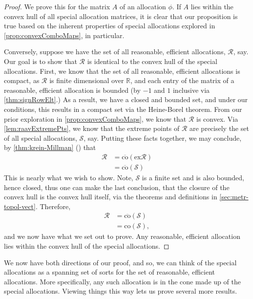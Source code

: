 \documentclass[12pt,letterpaper,final]{article}
\theoremstyle{plain}
\theoremstyle{plain}
\theoremstyle{plain}
\theoremstyle{plain}
\theoremstyle{plain}
\theoremstyle{plain}
\theoremstyle{plain}
\theoremstyle{definition}
\theoremstyle{definition}
\theoremstyle{definition}
\theoremstyle{definition}
\theoremstyle{definition}
\theoremstyle{remark}
\theoremstyle{remark}
\theoremstyle{remark}
\theoremstyle{remark}
\begin{document}
\begin{proof}
  We prove this for the matrix \(A\) of an allocation
  \(\phi\).  If \(A\) lies within the convex hull of all special
  allocation matrices, it is
  clear that our proposition is true based on the inherent properties
  of special allocations explored in \cref{prop:convexComboMaps}, in
  particular.

  Conversely, suppose we have the set of all reasonable, efficient allocations,
  \(\mathcal{R}\), say. Our goal is to show that
  \(\mathcal{R}\) is identical to the convex hull of the special allocations.
  First, we know that the set of all reasonable, efficient allocations is compact, as
  \(\mathcal{R}\) is finite dimensional over \(\mathbb{R}\), and each
  entry of the matrix of a reasonable, efficient allocation is bounded (by \(-1\) and
  \(1\) inclusive via \cref{thm:signRowElt}.) 
  As a result, we have a closed and bounded set, and
  under our conditions, this results in a compact set via the
  Heine-Borel theorem.
  From our prior exploration in
  \cref{prop:convexComboMaps}, we know that \(\mathcal{R}\)
  is convex. Via \cref{lem:raavExtremePts}, we know that the
  extreme points of \(\mathcal{R}\) are precisely the set of all
  special allocations, \(\mathcal{S}\), say. Putting these facts together, we
  may conclude, by  \cref{thm:krein-Millman}
  () that 
  \begin{align*}
    \mathcal{R}&=\overline{\text{co}}\left(\text{ex}\mathcal{R}\right)\\
               &=\overline{\text{co}}\left(\mathcal{S}\right)
  \end{align*}
  This is nearly what we wish to show. Note, 
  \(\mathcal{S}\) is a finite set and is also bounded, 
  hence closed, thus one can make the last conclusion, that the
  closure of 
  the convex hull is the convex hull itself, via the theorems and
  definitions in \cref{sec:metr-topol-vect}.
  Therefore,
  \begin{align*}
    \mathcal{R}&=\overline{\text{co}}\left(\mathcal{S}\right)\\
               &={\text{co}}\left(\mathcal{S}\right),
  \end{align*}
  and we now have what we set out to prove. Any reasonable,
  efficient
  allocation lies within the convex hull of the special allocations.
\end{proof}

We now have both directions of our proof, and so, we can think of the
special allocations as a spanning set of sorts for the set of
reasonable, efficient allocations. More specifically, any
such allocation is in the cone made up of the special
allocations. Viewing things this way lets us prove several more
results.
\end{document}
